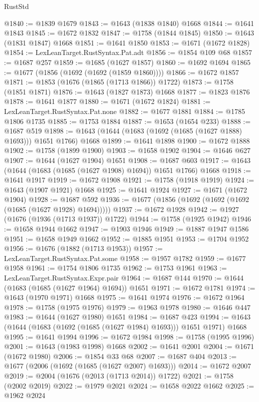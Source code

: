 \begin{lexlean}{RustStd}
\begin{coremodule}
@1840 := @1839 @1679
@1843 := @1643 (@1838 @1840) @1668
@1844 := @1641 @1843
@1845 := @1672 @1832
@1847 := @1758 (@1844 @1845)
@1850 := @1643 (@1831 @1847) @1668
@1851 := @1641 @1850
@1853 := @1671 (@1672 @1828)
@1854 := LexLeanTarget.RustSyntax.Pat.adt
@1856 := @1854 @109 @68
@1857 := @1687 @257
@1859 := @1685 (@1627 @1857)
@1860 := @1692 @1694
@1865 := @1677 (@1856 (@1692 (@1692 (@1859 @1860))))
@1866 := @1672 @1857
@1871 := @1853 (@1676 (@1865 (@1713 @1866)) @1722)
@1873 := @1758 (@1851 @1871)
@1876 := @1643 (@1827 @1873) @1668
@1877 := @1823 @1876
@1878 := @1641 @1877
@1880 := @1671 (@1672 @1824)
@1881 := LexLeanTarget.RustSyntax.Pat.none
@1882 := @1677 @1881
@1884 := @1785 @1806 @1735
@1885 := @1753 @1884
@1887 := @1653 (@1654 @233)
@1888 := @1687 @519
@1898 := @1643 (@1644 (@1683 (@1692 (@1685 (@1627 @1888) @1693))) @1651 @1766) @1668
@1899 := @1641 @1898
@1900 := @1672 @1888
@1902 := @1758 (@1899 @1900)
@1903 := @1658 @1902
@1904 := @1646 @627
@1907 := @1644 (@1627 @1904) @1651
@1908 := @1687 @603
@1917 := @1643 (@1644 (@1683 (@1685 (@1627 @1908) @1694)) @1651 @1766) @1668
@1918 := @1641 @1917
@1919 := @1672 @1908
@1921 := @1758 (@1918 @1919)
@1924 := @1643 (@1907 @1921) @1668
@1925 := @1641 @1924
@1927 := @1671 (@1672 @1904)
@1928 := @1687 @592
@1936 := @1677 (@1856 (@1692 (@1692 (@1692 (@1685 (@1627 @1928) @1694)))))
@1937 := @1672 @1928
@1942 := @1927 (@1676 (@1936 (@1713 @1937)) @1722)
@1944 := @1758 (@1925 @1942)
@1946 := @1658 @1944 @1662
@1947 := @1903 @1946
@1949 := @1887 @1947 @1586
@1951 := @1658 @1949 @1662
@1952 := @1885 @1951
@1953 := @1704 @1952
@1956 := @1676 (@1882 (@1713 @1953))
@1957 := LexLeanTarget.RustSyntax.Pat.some
@1958 := @1957 @1782
@1959 := @1677 @1958
@1961 := @1754 @1806 @1735
@1962 := @1753 @1961
@1963 := LexLeanTarget.RustSyntax.Expr.pair
@1964 := @1687 @144
@1970 := @1644 (@1683 (@1685 (@1627 @1964) @1694)) @1651
@1971 := @1672 @1781
@1974 := @1643 (@1970 @1971) @1668
@1975 := @1641 @1974
@1976 := @1672 @1964
@1978 := @1758 (@1975 @1976)
@1979 := @1963 @1978
@1980 := @1646 @447
@1983 := @1644 (@1627 @1980) @1651
@1984 := @1687 @423
@1994 := @1643 (@1644 (@1683 (@1692 (@1685 (@1627 @1984) @1693))) @1651 @1971) @1668
@1995 := @1641 @1994
@1996 := @1672 @1984
@1998 := @1758 (@1995 @1996)
@2001 := @1643 (@1983 @1998) @1668
@2002 := @1641 @2001
@2004 := @1671 (@1672 @1980)
@2006 := @1854 @33 @68
@2007 := @1687 @404
@2013 := @1677 (@2006 (@1692 (@1685 (@1627 @2007) @1693)))
@2014 := @1672 @2007
@2019 := @2004 (@1676 (@2013 (@1713 @2014)) @1722)
@2021 := @1758 (@2002 @2019)
@2022 := @1979 @2021
@2024 := @1658 @2022 @1662
@2025 := @1962 @2024

\end{coremodule}
\end{lexlean}
